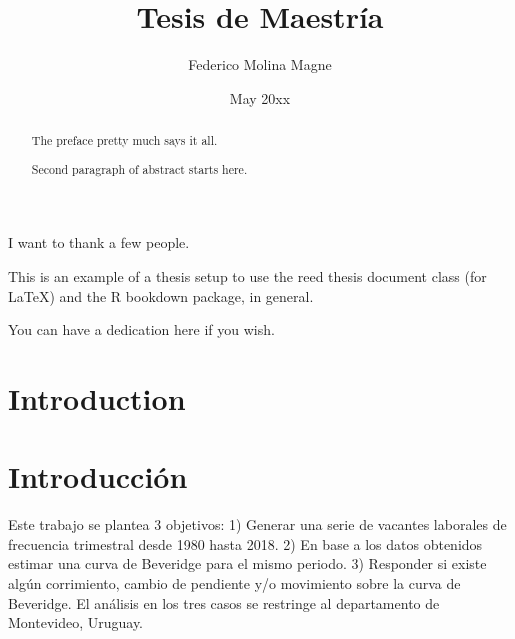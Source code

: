 \documentclass[12pt,twoside]{reedthesis}
\title{Tesis de Maestría}
\author{Federico Molina Magne}
\date{May 20xx}
\begin{document}
  \maketitle

\frontmatter %
\pagestyle{empty} %
  \begin{agradecimientos}
    I want to thank a few people.
  \end{agradecimientos}
  \begin{preface}
    This is an example of a thesis setup to use the reed thesis document class
    (for LaTeX) and the R bookdown package, in general.
  \end{preface}
  \hypersetup{linkcolor=black}
  \setcounter{tocdepth}{2}
  \tableofcontents

  \listoftables

  \listoffigures
  \begin{abstract}
    The preface pretty much says it all.
    
    \par
    
    Second paragraph of abstract starts here.
  \end{abstract}
  \begin{dedicacion}
    You can have a dedication here if you wish.
  \end{dedicacion}
\mainmatter %
\pagestyle{fancyplain} %

\hypertarget{introduction}{%
\chapter*{Introduction}\label{introduction}}

\hypertarget{intro}{%
\chapter{Introducción}\label{intro}}

Este trabajo se plantea 3 objetivos: 1) Generar una serie de vacantes laborales de frecuencia trimestral desde 1980 hasta 2018. 2) En base a los datos obtenidos estimar una curva de Beveridge para el mismo periodo. 3) Responder si existe algún corrimiento, cambio de pendiente y/o movimiento sobre la curva de Beveridge. El análisis en los tres casos se restringe al departamento de Montevideo, Uruguay.
\end{document}

